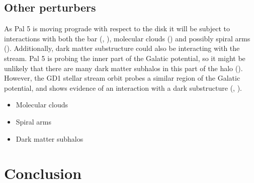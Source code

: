 \documentclass[modern]{aastex62}
\begin{document}
\subsection{Other perturbers}
As Pal 5 is moving prograde with respect to the disk it will be subject to interactions with both the bar (\citealt{Hattori:2016}, \citealt{price:2016b}), molecular clouds (\citealt{amorisco:2016}) and possibly spiral arms (\citealt{Banik:2019}). Additionally, dark matter substructure could also be interacting with the stream. Pal 5 is probing the inner part of the Galatic potential, so it might be unlikely that there are many dark matter subhalos in this part of the halo (\citealt{Garrison-Kimmel:2017}). However, the GD1 stellar stream orbit probes a similar region of the Galatic potential, and shows evidence of an interaction with a dark substructure (\citealt{Price-Whelan:2018}, \citealt{Bonaca:2018b}). 

\begin{itemize}
\item{Molecular clouds}
\item{Spiral arms}
\item{Dark matter subhalos}
\end{itemize}



\section{Conclusion}
\label{sec:conclusion}
\end{document}
